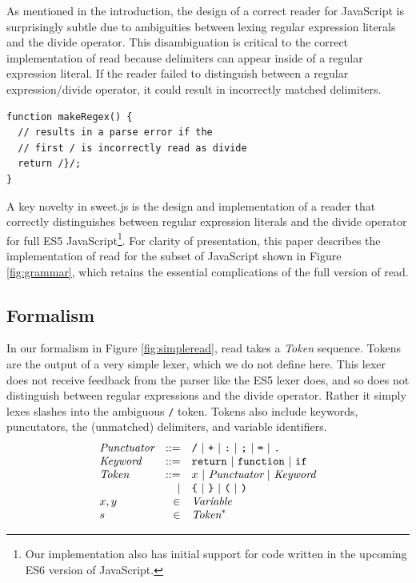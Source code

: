 \documentclass[preprint,10pt]{sigplanconf}
\begin{document}
As mentioned in the introduction, the design of a correct reader for JavaScript is surprisingly subtle due to ambiguities between lexing regular expression literals and the divide operator. This disambiguation is critical to the correct implementation of read because delimiters can appear inside of a regular expression literal. If the reader failed to distinguish between a regular expression/divide operator, it could result in incorrectly matched delimiters. 
\begin{lstlisting}
function makeRegex() {
  // results in a parse error if the
  // first / is incorrectly read as divide
  return /}/;
}
\end{lstlisting}

A key novelty in sweet.js is the design and implementation of a reader
that correctly distinguishes between regular expression literals and
the divide operator for full ES5 JavaScript\footnote{Our
  implementation also has initial support for code written in the
  upcoming ES6 version of JavaScript.}. For clarity of presentation,
this paper describes the implementation of read for the subset of
JavaScript shown in Figure \ref{fig:grammar}, which retains the
essential complications of the full version of read.

\subsection{Formalism}

In our formalism in Figure \ref{fig:simpleread}, read takes a \textit{Token} sequence. Tokens are the output of a very simple lexer, which we do not define here. This lexer does not receive feedback from the parser like the ES5 lexer does, and so does not distinguish between regular expressions and the divide operator. Rather it simply lexes slashes into the ambiguous \texttt{/} token. Tokens also include keywords, puncutators, the (unmatched) delimiters, and variable identifiers.
\[
\begin{array}{lrl}
  \textit{Punctuator} &::=& \texttt{/} ~|~ \texttt{+} ~|~ \texttt{:} ~|~
  \texttt{;} ~|~ \texttt{=} ~|~ \texttt{.}
  \\
  \textit{Keyword} &::=& \texttt{return} ~|~ \texttt{function}~|~ \texttt{if}
  \\
  \textit{Token} &::=& x ~|~ \textit{Punctuator} ~|~ \textit{Keyword}
  \\
  &|& 
  \texttt{\{} ~|~ 
  \texttt {\}} ~|~  
  \texttt{(} ~|~ 
  \texttt{)}
  \\
  x, y &\in& \textit{Variable}
  \\
  s &\in& \textit{Token}^{*}
 \end{array}
\]
\end{document}
